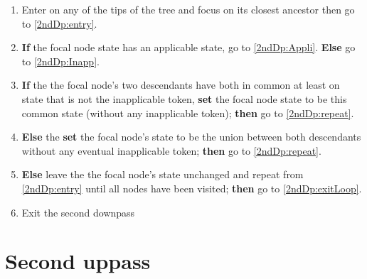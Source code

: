 \documentclass[a4paper,12pt]{article}
\begin{document}
\begin{enumerate}
    \item Enter on any of the tips of the tree and focus on its closest ancestor then go to \ref{2ndDp:entry}.
    \item \label{2ndDp:entry} \textbf{If} the focal node state has an applicable state, go to \ref{2ndDp:Appli}. \textbf{Else} go to \ref{2ndDp:Inapp}.
    \item \label{2ndDp:Appli} \textbf{If} the the focal node's two descendants have both in common at least on state that is not the inapplicable token, \textbf{set} the focal node state to be this common state (without any inapplicable token); \textbf{then} go to \ref{2ndDp:repeat}.
    \item \label{2ndDp:Inapp} \textbf{Else} the \textbf{set} the focal node's state to be the union between both descendants without any eventual inapplicable token; \textbf{then} go to \ref{2ndDp:repeat}.
    \item \label{2ndDp:repeat} \textbf{Else} leave the the focal node's state unchanged and repeat from \ref{2ndDp:entry} until all nodes have been visited; \textbf{then} go to \ref{2ndDp:exitLoop}.
    \item \label{2ndDp:exitLoop} Exit the second downpass
\end{enumerate}

\section{Second uppass} \label{2ndUp}
\end{document}
